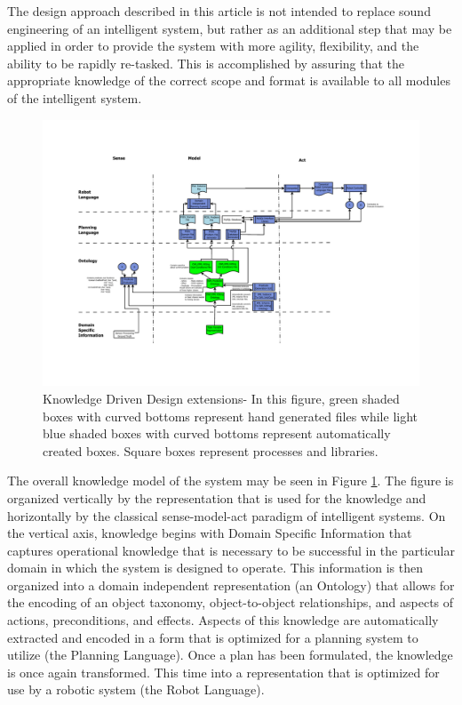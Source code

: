 The design approach described in this article is not intended to
replace sound engineering of an intelligent system, but rather as 
an additional step that may be applied in order to provide
the system with more agility, flexibility, and the ability to be rapidly
re-tasked. This is accomplished by assuring that the appropriate knowledge
of the correct scope and format is available to all modules of the
intelligent system.

\begin{figure}[ht!]
\begin{center}
\includegraphics[width=16cm]{images/KnowledgeDrivenRobotics.pdf}
\caption{Knowledge Driven Design extensions- In this figure, green shaded boxes with curved bottoms 
represent hand generated files while
light blue shaded boxes with curved bottoms represent automatically created boxes. Square
boxes represent processes and libraries.}
\label{fig:DesignArchitecture}
\end{center}
\end{figure}

The overall knowledge model of the system may be seen in Figure \ref{fig:DesignArchitecture}.
The figure is organized vertically by the representation that is used for the knowledge
and horizontally by the classical sense-model-act paradigm of intelligent systems.
On the vertical axis, knowledge begins with Domain Specific Information that captures
operational knowledge that is necessary to be successful in the particular domain in which
the system is designed to operate. This information is then organized into a domain
independent representation (an Ontology) that allows for the encoding of an object 
taxonomy, object-to-object
relationships, and aspects of actions, preconditions, and effects. 
Aspects of this
knowledge are automatically extracted and encoded in a form that is optimized for
a planning system to utilize (the Planning Language). Once a plan has been formulated, the knowledge is once
again transformed. This time into a representation that is optimized for use by a robotic system
(the Robot Language).

